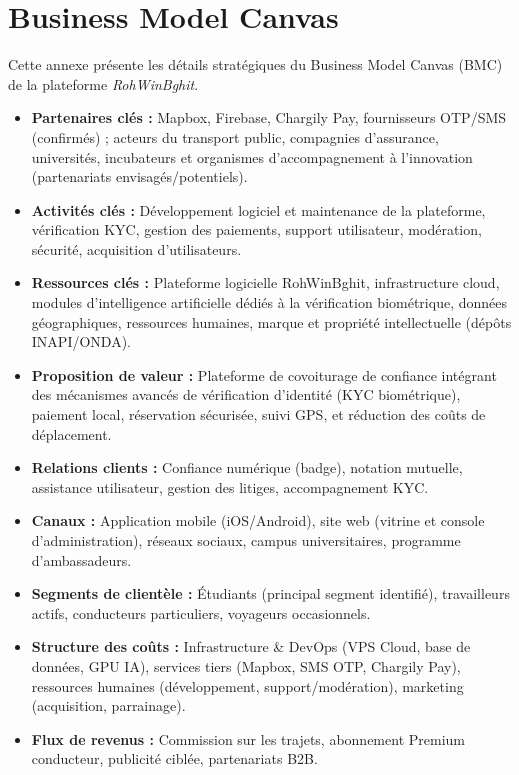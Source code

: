 \chapter{Business Model Canvas}
\label{annexe:bmc}

Cette annexe présente les détails stratégiques du Business Model Canvas (BMC) de la plateforme \textit{RohWinBghit}.

\begin{itemize}
  \item \textbf{Partenaires clés :} Mapbox, Firebase, Chargily Pay, fournisseurs OTP/SMS (confirmés) ; acteurs du transport public, compagnies d'assurance, universités, incubateurs et organismes d'accompagnement à l'innovation (partenariats envisagés/potentiels).
  \item \textbf{Activités clés :} Développement logiciel et maintenance de la plateforme, vérification KYC, gestion des paiements, support utilisateur, modération, sécurité, acquisition d'utilisateurs.
  \item \textbf{Ressources clés :} Plateforme logicielle RohWinBghit, infrastructure cloud, modules d'intelligence artificielle dédiés à la vérification biométrique, données géographiques, ressources humaines, marque et propriété intellectuelle (dépôts INAPI/ONDA).
  \item \textbf{Proposition de valeur :} Plateforme de covoiturage de confiance intégrant des mécanismes avancés de vérification d'identité (KYC biométrique), paiement local, réservation sécurisée, suivi GPS, et réduction des coûts de déplacement.
  \item \textbf{Relations clients :} Confiance numérique (badge), notation mutuelle, assistance utilisateur, gestion des litiges, accompagnement KYC.
  \item \textbf{Canaux :} Application mobile (iOS/Android), site web (vitrine et console d'administration), réseaux sociaux, campus universitaires, programme d'ambassadeurs.
  \item \textbf{Segments de clientèle :} Étudiants (principal segment identifié), travailleurs actifs, conducteurs particuliers, voyageurs occasionnels.
  \item \textbf{Structure des coûts :} Infrastructure \& DevOps (VPS Cloud, base de données, GPU IA), services tiers (Mapbox, SMS OTP, Chargily Pay), ressources humaines (développement, support/modération), marketing (acquisition, parrainage).
  \item \textbf{Flux de revenus :} Commission sur les trajets, abonnement Premium conducteur, publicité ciblée, partenariats B2B.
\end{itemize}
